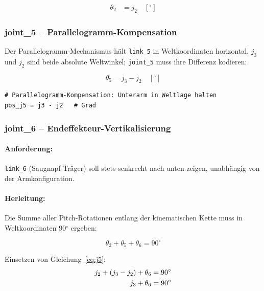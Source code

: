 \documentclass[11pt,a4paper]{article}
\begin{document}
\begin{align}
  \theta_2 &= j_2 \quad [{}^\circ]
\end{align}

\subsubsection{joint\_5 -- Parallelogramm-Kompensation}
\label{sec:j5}

Der Parallelogramm-Mechanismus hält \texttt{link\_5} in
Weltkoordinaten horizontal. $j_3$ und $j_2$ sind beide absolute
Weltwinkel; \texttt{joint\_5} muss ihre Differenz kodieren:

\begin{equation}
  \theta_5 = j_3 - j_2 \quad [{}^\circ]
  \label{eq:j5}
\end{equation}

\begin{lstlisting}[caption={Berechnung joint\_5 in update\_step()}]
# Parallelogramm-Kompensation: Unterarm in Weltlage halten
pos_j5 = j3 - j2   # Grad
\end{lstlisting}

\subsubsection{joint\_6 -- Endeffekteur-Vertikalisierung}
\label{sec:j6}

\paragraph{Anforderung:}
\texttt{link\_6} (Saugnapf-Träger) soll stets senkrecht nach unten
zeigen, unabhängig von der Armkonfiguration.

\paragraph{Herleitung:}
Die Summe aller Pitch-Rotationen entlang der kinematischen Kette
muss in Weltkoordinaten $90{{}^\circ}$ ergeben:

\begin{equation}
  \theta_2 + \theta_5 + \theta_6 = 90{{}^\circ}
  \label{eq:kette}
\end{equation}

Einsetzen von Gleichung~\eqref{eq:j5}:
\begin{align}
  j_2 + (j_3 - j_2) + \theta_6 &= 90{{}^\circ} \notag \\
  j_3 + \theta_6                &= 90{{}^\circ} \notag
\end{align}
\end{document}
